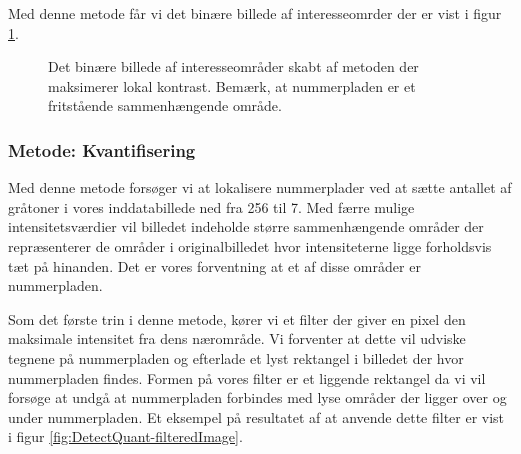 Med denne metode får vi det binære billede af interesseomrder der er vist i figur \ref{fig:DetectCStretch-binary}.

\begin{figure}[htp]
  \centering
  \caption{Det binære billede af interesseområder skabt af metoden der maksimerer lokal kontrast. Bemærk, at nummerpladen er et fritstående sammenhængende område.}
  \label{fig:DetectCStretch-binary}
\end{figure}

\subsubsection{Metode: Kvantifisering}
Med denne metode forsøger vi at lokalisere nummerplader ved at sætte antallet af gråtoner i vores inddatabillede ned fra 256 til 7. Med færre mulige intensitetsværdier vil billedet indeholde større sammenhængende områder der repræsenterer de områder i originalbilledet hvor intensiteterne ligge forholdsvis tæt på hinanden. Det er vores forventning at et af disse områder er nummerpladen.

Som det første trin i denne metode, kører vi et filter der giver en pixel den maksimale intensitet fra dens nærområde. Vi forventer at dette vil udviske tegnene på nummerpladen og efterlade et lyst rektangel i billedet der hvor nummerpladen findes. Formen på vores filter er et liggende rektangel da vi vil forsøge at undgå at nummerpladen forbindes med lyse områder der ligger over og under nummerpladen. Et eksempel på resultatet af at anvende dette filter er vist i figur \vref{fig:DetectQuant-filteredImage}. 

